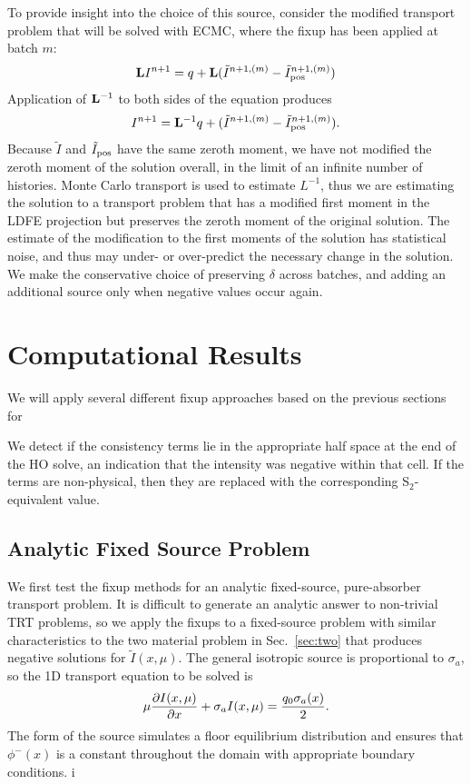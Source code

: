To provide insight into the choice of this source, consider the modified transport problem
that will be solved with ECMC, where the fixup has been applied at batch $m$:
\begin{equation}
   \mathbf{L} I^{n+1} = q + \mathbf{L}(\tilde{I}^{n+1,(m)} -
    \tilde{I}^{n+1,(m)}_{\text{pos}})
\end{equation}
Application of $\mathbf{L}^{-1}$ to both sides of the equation produces
\begin{equation}
    I^{n+1} = \mathbf{L}^{-1} q + (\tilde{I}^{n+1,(m)} -
    \tilde{I}^{n+1,(m)}_{\text{pos}}).
\end{equation}
Because $\tilde I$ and $\tilde I_{\text{pos}}$ have the same zeroth moment, we have not modified
the zeroth moment of the solution overall, in the limit of an infinite number of histories.  Monte Carlo transport is used to estimate $L^{-1}$, thus 
we are estimating the solution to a transport problem that has a modified first moment in the LDFE projection but preserves the
zeroth moment of the original solution.  The estimate of the modification to the first
moments of the solution has statistical noise, and thus may under- or over-predict the
necessary change in the solution.  We make the conservative choice of preserving $\delta$
across batches, and adding an additional source only when negative values occur again. 

\section{Computational Results}

We will apply several different fixup approaches based on the previous sections for

We detect if
the consistency terms lie in the appropriate half space at the end of the HO solve,
an indication that the intensity was negative within that cell.  If the terms are non-physical, then
they are replaced with the corresponding S$_2$-equivalent value.

\subsection{Analytic Fixed Source Problem}

We first test the fixup methods for an analytic fixed-source, pure-absorber transport problem.  It is
difficult to generate an analytic answer to non-trivial TRT problems, so we apply the
fixups to a
fixed-source problem with similar characteristics to the two material problem in
Sec.~\ref{sec:two} that produces negative solutions for $\tilde I(x,\mu)$.  The general
isotropic source is proportional to $\sigma_a$, so the 1D transport equation to be solved is 
\begin{equation}\label{apptr}
    \mu \frac{\partial I(x,\mu)}{\partial x} + \sigma_a I(x,\mu) = \frac{q_0\sigma_a(x)}{2}.
\end{equation}
The form of the source simulates a floor equilibrium distribution and ensures that $\phi^-(x)$ is a
constant throughout the domain with appropriate boundary conditions. i

